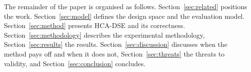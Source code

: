 The remainder of the paper is organised as follows. Section~\ref{sec:related} positions
the work. Section~\ref{sec:model} defines the design space and the evaluation model.
Section~\ref{sec:method} presents HCA-DSE and its correctness.
Section~\ref{sec:methodology} describes the experimental methodology,
Section~\ref{sec:results} the results. Section~\ref{sec:discussion} discusses when the
method pays off and when it does not, Section~\ref{sec:threats} the threats to validity,
and Section~\ref{sec:conclusion} concludes.

